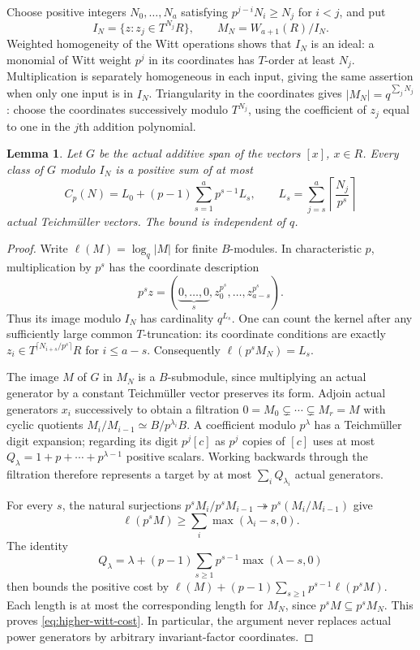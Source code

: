 \documentclass[11pt,reqno]{amsart}
\numberwithin{equation}{section}
\newtheorem{lemma}[theorem]{Lemma}
\theoremstyle{definition}
\begin{document}
Choose positive integers $N_0,\ldots,N_a$ satisfying
$p^{j-i}N_i\ge N_j$ for $i<j$, and put
\[
 I_N=\{z:z_j\in T^{N_j}R\},\qquad
 M_N=W_{a+1}(R)/I_N.
\]
Weighted homogeneity of the Witt operations shows that $I_N$ is an
ideal: a monomial of Witt weight $p^j$ in its coordinates has
$T$-order at least $N_j$. Multiplication is separately homogeneous
in each input, giving the same assertion when only one input is in
$I_N$. Triangularity in the coordinates gives
$|M_N|=q^{\sum_jN_j}$: choose the coordinates successively modulo
$T^{N_j}$, using the coefficient of $z_j$ equal to one in the
$j$th addition polynomial.

\begin{lemma}\label{lem:higher-witt-coefficients}
Let $G$ be the actual additive span of the vectors $[x]$, $x\in R$.
Every class of $G$ modulo $I_N$ is a positive sum of at most
\begin{equation}\label{eq:higher-witt-cost}
 C_p(N)=L_0+(p-1)\sum_{s=1}^a p^{s-1}L_s,
 \qquad
 L_s=\sum_{j=s}^a\left\lceil\frac{N_j}{p^s}\right\rceil
\end{equation}
actual Teichm\"uller vectors. The bound is independent of $q$.
\end{lemma}
\begin{proof}
Write $\ell(M)=\log_q|M|$ for finite $B$-modules. In characteristic
$p$, multiplication by $p^s$ has the coordinate description
\[
 p^sz=(\underbrace{0,\ldots,0}_{s},
             z_0^{p^s},\ldots,z_{a-s}^{p^s}).
\]
Thus its image modulo $I_N$ has cardinality $q^{L_s}$.
One can count the kernel after any sufficiently large common
$T$-truncation: its coordinate conditions are exactly
$z_i\in T^{\lceil N_{i+s}/p^s\rceil}R$ for $i\le a-s$.
Consequently $\ell(p^sM_N)=L_s$.

The image $M$ of $G$ in $M_N$ is a $B$-submodule, since multiplying
an actual generator by a constant Teichm\"uller vector preserves its
form. Adjoin actual generators $x_i$ successively to obtain a
filtration $0=M_0\subsetneq\cdots\subsetneq M_r=M$ with cyclic
quotients $M_i/M_{i-1}\simeq B/p^{\lambda_i}B$.
A coefficient modulo $p^\lambda$ has a Teichm\"uller digit expansion;
regarding its digit $p^j[c]$ as $p^j$ copies of $[c]$ uses at most
$Q_\lambda=1+p+\cdots+p^{\lambda-1}$ positive scalars. Working
backwards through the filtration therefore represents a target by
at most $\sum_iQ_{\lambda_i}$ actual generators.

For every $s$, the natural surjections
$p^sM_i/p^sM_{i-1}\twoheadrightarrow p^s(M_i/M_{i-1})$ give
\[
 \ell(p^sM)\ge\sum_i\max(\lambda_i-s,0).
\]
The identity
\[
 Q_\lambda=\lambda+
   (p-1)\sum_{s\ge1}p^{s-1}\max(\lambda-s,0)
\]
then bounds the positive cost by
$\ell(M)+(p-1)\sum_{s\ge1}p^{s-1}\ell(p^sM)$.
Each length is at most the corresponding length for $M_N$, since
$p^sM\subseteq p^sM_N$. This proves
\eqref{eq:higher-witt-cost}. In particular, the argument never
replaces actual power generators by arbitrary invariant-factor
coordinates.
\end{proof}
\end{document}
